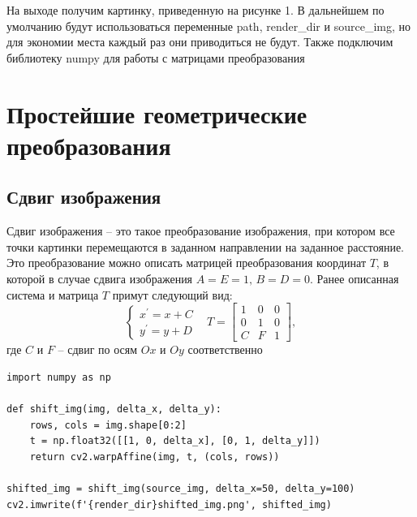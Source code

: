 \documentclass[a4paper, 16pt]{article}
\begin{document}
\noindent На выходе получим картинку, приведенную на рисунке 1. В дальнейшем по умолчанию будут использоваться
переменные path, render\_{dir} и source\_{img}, но для экономии места каждый раз они приводиться не будут. Также подключим
библиотеку numpy для работы с матрицами преобразования


\section{Простейшие геометрические преобразования}
\subsection{Сдвиг изображения}
\noindent Сдвиг изображения -- это такое преобразование изображения, при котором все точки
картинки перемещаются в заданном направлении на заданное расстояние. Это преобразование можно
описать матрицей преобразования координат $T$, в которой в случае сдвига изображения $A=E=1,\,B=D=0$.
Ранее описанная система и матрица $T$ примут следующий вид:
$$
\begin{cases}
    x^{\prime}=x+C\\
    y^{\prime}=y+D
\end{cases}\,\,\,\,\,
T=
\begin{bmatrix}
    1 &0 &0\\
    0 &1 &0\\
    C &F &1
\end{bmatrix},
$$
\noindent где $C \text{ и } F$ -- сдвиг по осям $Ox \text{ и } Oy$ соответственно


\begin{lstlisting}[label=shift-code,caption=Код для сдвига изображения на 50 и 100 пикселей по осям $Ox \text{ и } Oy$]
import numpy as np

def shift_img(img, delta_x, delta_y):
    rows, cols = img.shape[0:2]
    t = np.float32([[1, 0, delta_x], [0, 1, delta_y]])
    return cv2.warpAffine(img, t, (cols, rows))

shifted_img = shift_img(source_img, delta_x=50, delta_y=100)
cv2.imwrite(f'{render_dir}shifted_img.png', shifted_img)
\end{lstlisting}
\end{document}
